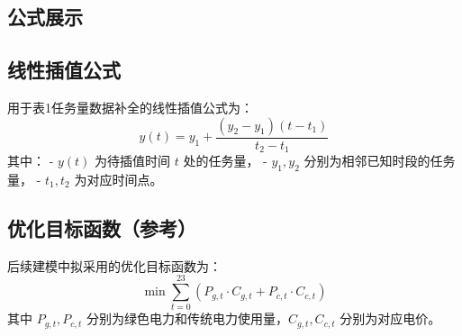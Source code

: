 \documentclass{article}
\begin{document}
\begin{CJK}{UTF8}{gbsn}

\section*{公式展示}

\subsection*{线性插值公式}
用于表1任务量数据补全的线性插值公式为：
\[
y(t) = y_1 + \frac{(y_2 - y_1)(t - t_1)}{t_2 - t_1}
\]
其中：
- \( y(t) \) 为待插值时间 \( t \) 处的任务量，
- \( y_1, y_2 \) 分别为相邻已知时段的任务量，
- \( t_1, t_2 \) 为对应时间点。

\subsection*{优化目标函数（参考）}
后续建模中拟采用的优化目标函数为：
\[
\min \sum_{t=0}^{23} (P_{g,t} \cdot C_{g,t} + P_{c,t} \cdot C_{c,t})
\]
其中 \( P_{g,t}, P_{c,t} \) 分别为绿色电力和传统电力使用量，\( C_{g,t}, C_{c,t} \) 分别为对应电价。

\end{CJK}
\end{document}
